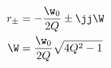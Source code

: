 \documentclass{book}
\begin{document}
\begin{align*}
	r_\pm & = - \frac{\w_0}{2Q} \pm \jj\W
	\\{}
	\W    & = \frac{\w_0}{2Q}\sqrt{4Q^2 - 1}
\end{align*}
\end{document}
